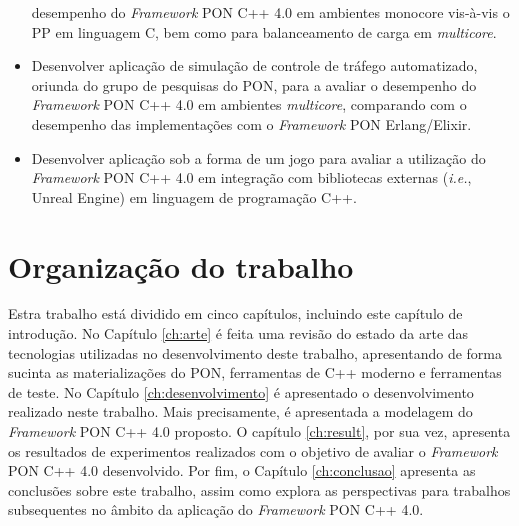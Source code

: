 \begin{itemize}
        desempenho do \textit{Framework} PON C++ 4.0 em ambientes monocore
        vis-à-vis o PP em linguagem C, bem como para balanceamento de carga em
        \textit{multicore}.
  \item Desenvolver aplicação de simulação de controle de tráfego automatizado,
        oriunda do grupo de pesquisas do PON, para a avaliar o desempenho do
        \textit{Framework} PON C++ 4.0 em ambientes \textit{multicore},
        comparando com o desempenho das implementações com o \textit{Framework}
        PON Erlang/Elixir.
  \item Desenvolver aplicação sob a forma de um jogo para avaliar a utilização
        do \textit{Framework} PON C++ 4.0 em integração com bibliotecas externas
        (\textit{i.e.}, Unreal Engine) em linguagem de programação C++.

\end{itemize}

\section{Organização do trabalho}

Estra trabalho está dividido em cinco capítulos, incluindo este capítulo de
introdução. No Capítulo \ref{ch:arte} é feita uma revisão do estado da arte das
tecnologias utilizadas no desenvolvimento deste trabalho, apresentando de forma
sucinta as materializações do PON, ferramentas de C++ moderno e ferramentas de
teste. No Capítulo \ref{ch:desenvolvimento} é apresentado o desenvolvimento
realizado neste trabalho. Mais precisamente, é apresentada a modelagem do
\textit{Framework} PON C++ 4.0 proposto. O capítulo \ref{ch:result}, por sua
vez, apresenta os resultados de experimentos realizados com o objetivo de
avaliar o \textit{Framework} PON C++ 4.0 desenvolvido. Por fim, o Capítulo
\ref{ch:conclusao} apresenta as conclusões sobre este trabalho, assim como
explora as perspectivas para trabalhos subsequentes no âmbito da aplicação do
\textit{Framework} PON C++ 4.0.

